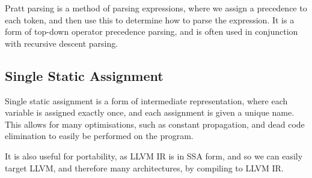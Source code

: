 Pratt parsing is a method of parsing expressions, where we assign a precedence to each token, and then use this to determine how to parse the expression.
It is a form of top-down operator precedence parsing, and is often used in conjunction with recursive descent parsing.

\subsection*{Single Static Assignment}\label{subsec:ssa}
Single static assignment is a form of intermediate representation, where each variable is assigned exactly once, and each assignment is given a unique name.
This allows for many optimisations, such as constant propagation, and dead code elimination to easily be performed on the program.

It is also useful for portability, as LLVM IR is in SSA form, and so we can easily target LLVM, and therefore many architectures, by compiling to LLVM IR.

